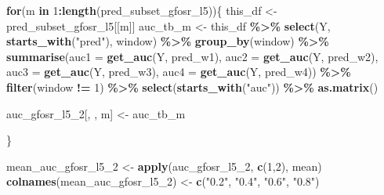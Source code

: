 \documentclass[
]{article}
\newenvironment{Shaded}{\begin{snugshade}}{\end{snugshade}}
\newcommand{\AttributeTok}[1]{\textcolor[rgb]{0.13,0.29,0.53}{#1}}
\newcommand{\ControlFlowTok}[1]{\textcolor[rgb]{0.13,0.29,0.53}{\textbf{#1}}}
\newcommand{\DecValTok}[1]{\textcolor[rgb]{0.00,0.00,0.81}{#1}}
\newcommand{\FunctionTok}[1]{\textcolor[rgb]{0.13,0.29,0.53}{\textbf{#1}}}
\newcommand{\NormalTok}[1]{#1}
\newcommand{\OtherTok}[1]{\textcolor[rgb]{0.56,0.35,0.01}{#1}}
\newcommand{\SpecialCharTok}[1]{\textcolor[rgb]{0.81,0.36,0.00}{\textbf{#1}}}
\newcommand{\StringTok}[1]{\textcolor[rgb]{0.31,0.60,0.02}{#1}}
\begin{document}
\begin{Shaded}
\begin{Highlighting}[]
\ControlFlowTok{for}\NormalTok{(m }\ControlFlowTok{in} \DecValTok{1}\SpecialCharTok{:}\FunctionTok{length}\NormalTok{(pred\_subset\_gfosr\_l5))\{}
\NormalTok{  this\_df }\OtherTok{\textless{}{-}}\NormalTok{ pred\_subset\_gfosr\_l5[[m]]}
\NormalTok{  auc\_tb\_m }\OtherTok{\textless{}{-}}\NormalTok{ this\_df }\SpecialCharTok{\%\textgreater{}\%}
  \FunctionTok{select}\NormalTok{(Y, }\FunctionTok{starts\_with}\NormalTok{(}\StringTok{"pred"}\NormalTok{), window) }\SpecialCharTok{\%\textgreater{}\%}
  \FunctionTok{group\_by}\NormalTok{(window) }\SpecialCharTok{\%\textgreater{}\%}
  \FunctionTok{summarise}\NormalTok{(}\AttributeTok{auc1 =} \FunctionTok{get\_auc}\NormalTok{(Y, pred\_w1),}
            \AttributeTok{auc2 =} \FunctionTok{get\_auc}\NormalTok{(Y, pred\_w2),}
            \AttributeTok{auc3 =} \FunctionTok{get\_auc}\NormalTok{(Y, pred\_w3),}
            \AttributeTok{auc4 =} \FunctionTok{get\_auc}\NormalTok{(Y, pred\_w4)) }\SpecialCharTok{\%\textgreater{}\%}
  \FunctionTok{filter}\NormalTok{(window }\SpecialCharTok{!=} \DecValTok{1}\NormalTok{) }\SpecialCharTok{\%\textgreater{}\%} 
  \FunctionTok{select}\NormalTok{(}\FunctionTok{starts\_with}\NormalTok{(}\StringTok{"auc"}\NormalTok{)) }\SpecialCharTok{\%\textgreater{}\%} \FunctionTok{as.matrix}\NormalTok{()}
  
\NormalTok{  auc\_gfosr\_l5\_2[, , m] }\OtherTok{\textless{}{-}}\NormalTok{ auc\_tb\_m}
  
\NormalTok{\}}

\NormalTok{mean\_auc\_gfosr\_l5\_2 }\OtherTok{\textless{}{-}} \FunctionTok{apply}\NormalTok{(auc\_gfosr\_l5\_2, }\FunctionTok{c}\NormalTok{(}\DecValTok{1}\NormalTok{,}\DecValTok{2}\NormalTok{), mean)}
\FunctionTok{colnames}\NormalTok{(mean\_auc\_gfosr\_l5\_2) }\OtherTok{\textless{}{-}} \FunctionTok{c}\NormalTok{(}\StringTok{"0.2"}\NormalTok{, }\StringTok{"0.4"}\NormalTok{, }\StringTok{"0.6"}\NormalTok{, }\StringTok{"0.8"}\NormalTok{)}
\end{Highlighting}
\end{Shaded}
\end{document}
